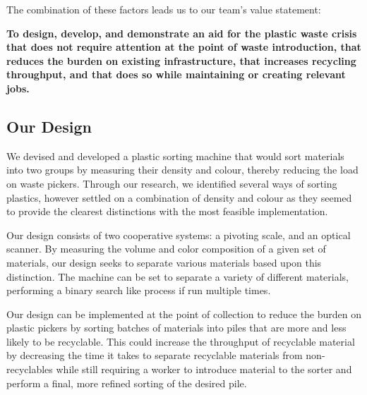\documentclass[12pt]{article}
\begin{document}
\begin{multicols*}{2}
            The combination of these factors leads us to our team's value statement:

            \textbf{To design, develop, and demonstrate an aid for the plastic waste crisis that does not require attention at the point of waste introduction, that reduces the burden on existing infrastructure, that increases recycling throughput, and that does so while maintaining or creating relevant jobs.}

        \subsection{Our Design}
            We devised and developed a plastic sorting machine that would sort materials into two groups by measuring their density and colour, thereby reducing the load on waste pickers. Through our research, we identified several ways of sorting plastics, however settled on a combination of density and colour as they seemed to provide the clearest distinctions \cite{gent2009recycling} \cite{safavi2010sorting} \cite{bruno2000automated} with the most feasible implementation. 
            
            Our design consists of two cooperative systems: a pivoting scale, and an optical scanner. By  measuring the volume and color composition of a given set of materials, our design seeks to separate various materials based upon this distinction. The machine can be set to separate a variety of different materials, performing a binary search like process if run multiple times.

            Our design can be implemented at the point of collection to reduce the burden on plastic pickers by sorting batches of materials into piles that are more and less likely to be recyclable. This could increase the throughput of recyclable material by decreasing the time it takes to separate recyclable materials from non-recyclables while still requiring a worker to introduce material to the sorter and perform a final, more refined sorting of the desired pile.


\end{multicols*}
\end{document}
